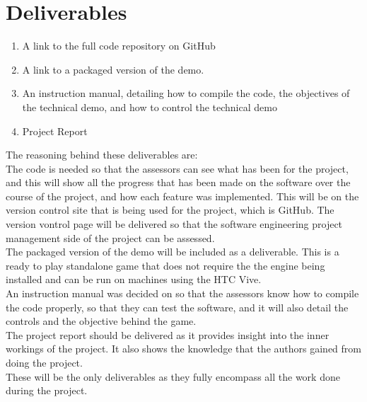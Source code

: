 

\section{Deliverables}
\begin{enumerate}
	\item A link to the full code repository on GitHub
	\item A link to a packaged version of the demo.
	\item An instruction manual, detailing how to compile the code, the objectives of the technical demo, and how to control the technical demo
	\item Project Report
\end{enumerate}

The reasoning behind these deliverables are:\\
The code is needed so that the assessors can see what has been for the project, and this will show all the progress that has been made on the software over the course of the project, and how each feature was implemented. This will be on the version control site that is being used for the project, which is GitHub. The version vontrol page will be delivered so that the software engineering project management side of the project can be assessed.\\
The packaged version of the demo will be included as a deliverable. This is a ready to play standalone game that does not require the the engine being installed and can be run on machines using the HTC Vive.\\
An instruction manual was decided on so that the assessors know how to compile the code properly, so that they can test the software, and it will also detail the controls and the objective behind the game.\\

The project report should be delivered as it provides insight into the inner workings of the project. It also shows the knowledge that the authors gained from doing the project.\\
These will be the only deliverables as they fully encompass all the work done during the project.\\